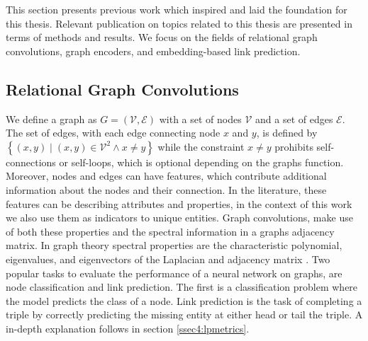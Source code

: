 This section presents previous work which inspired and laid the foundation for this thesis. Relevant publication on topics related to this thesis are presented in terms of methods and results. We focus on the fields of relational graph convolutions, graph encoders, and embedding-based link prediction.

\subsection{Relational Graph Convolutions}
We define a graph as $G=(\mathcal{V}, \mathcal{E})$  with a set of nodes $\mathcal{V}$ and a set of edges $\mathcal{E}$. The set of edges, with each edge connecting node $x$ and $y$, is defined by $\left\{(x, y) \mid(x, y) \in \mathcal{V}^{2} \wedge x \neq y\right\}$ while the constraint $x \neq y$ prohibits self-connections or self-loops, which is optional depending on the graphs function. Moreover, nodes and edges can have features, which contribute additional information about the nodes and their connection. In the literature, these features can be describing attributes and properties, in the context of this work we also use them as indicators to unique entities. Graph convolutions, make use of both these properties and the spectral information in a graphs adjacency matrix. In graph theory spectral properties are the characteristic polynomial, eigenvalues, and eigenvectors of the Laplacian and adjacency matrix \cite{chung1997spectral}. Two popular tasks to evaluate the performance of a neural network on graphs, are node classification and link prediction. The first is a classification problem where the model predicts the class of a node. Link prediction is the task of completing a triple by correctly predicting the missing entity at either head or tail the triple. A in-depth explanation follows in section \ref{ssec4:lpmetrics}.


